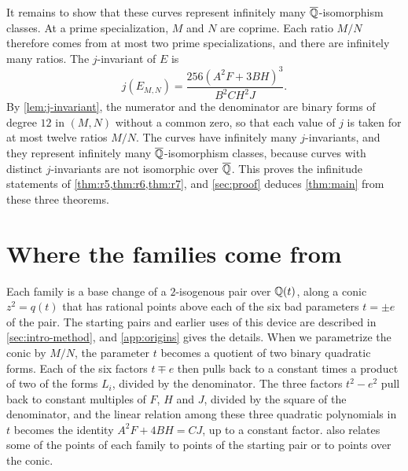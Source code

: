 It remains to show that these curves represent infinitely many $\overline{\mathbb Q}$-isomorphism classes. At a prime specialization, $M$ and $N$ are coprime. Each ratio $M/N$ therefore comes from at most two prime specializations, and there are infinitely many ratios. The $j$-invariant of $E$ is
\begin{equation*}
j(E_{M,N})=\frac{256(A^2F+3BH)^3}{B^2CH^2J}.
\end{equation*}
By \cref{lem:j-invariant}, the numerator and the denominator are binary forms of degree $12$ in $(M,N)$ without a common zero, so that each value of $j$ is taken for at most twelve ratios $M/N$. The curves have infinitely many $j$-invariants, and they represent infinitely many $\overline{\mathbb Q}$-isomorphism classes, because curves with distinct $j$-invariants are not isomorphic over $\overline{\mathbb Q}$. This proves the infinitude statements of \cref{thm:r5,thm:r6,thm:r7}, and \cref{sec:proof} deduces \cref{thm:main} from these three theorems.

\section{Where the families come from}\label{sec:overview-origin}

Each family is a base change of a $2$-isogenous pair over $\mathbb Q(t)$, along a conic $z^2=q(t)$ that has rational points above each of the six bad parameters $t=\pm e$ of the pair. The starting pairs and earlier uses of this device are described in \cref{sec:intro-method}, and \cref{app:origins} gives the details. When we parametrize the conic by $M/N$, the parameter $t$ becomes a quotient of two binary quadratic forms. Each of the six factors $t\mp e$ then pulls back to a constant times a product of two of the forms $L_i$, divided by the denominator. The three factors $t^2-e^2$ pull back to constant multiples of $F$, $H$ and $J$, divided by the square of the denominator, and the linear relation among these three quadratic polynomials in $t$ becomes the identity $A^2F+4BH=CJ$, up to a constant factor.  also relates some of the points of each family to points of the starting pair or to points over the conic.

